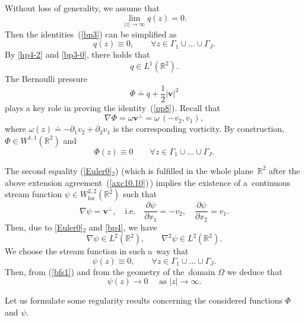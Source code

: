 \documentclass[11pt]{article}
\numberwithin{equation}{section}
\numberwithin{figure}{section}
\newcommand{\R}{\mathbb{R}}
\def\loc{{\mathrm{loc}}}
\def\R{{\mathbb R}}
\def\ve{{\mathbf v}}
\begin{document}
Without loss of generality, we assume that
 \begin{equation} \label{co-3}
 \lim\limits_{|z|\to\infty}q(z)=0.
\end{equation}
Then the identities~(\ref{bp3}) can be simplified as
\begin{equation} \label{bp3-0}
q(z)\equiv 0,\qquad\forall z\in\Gamma_1\cup\dots\cup\Gamma_J.\end{equation}
By \eqref{hp4-2} and \eqref{bp3-0}, there holds that
 \begin{equation} \label{co-5}
q\in L^1(\R^2).
\end{equation}
The Bernoulli pressure 
$$\Phi\doteq q+\frac12|\ve|^2$$ 
plays a key role in proving the identity~(\ref{pp8}). Recall that
\begin{equation}  \label{pp9}
\nabla\Phi=\omega\ve^\bot=\omega\,(-v_2,v_1),
\end{equation}
where $\omega(z)\doteq -\partial_1v_2+\partial_2v_1$ is the corresponding vorticity.
By construction, $\Phi\in W^{1,1}(\R^2)$ and
\begin{equation} \label{bf0}
\Phi(z)\equiv 0\qquad\forall z\in\Gamma_1\cup\dots\cup\Gamma_J.
\end{equation}

The second equality (\ref{Euler0}$_2$)  (which is fulfilled
in the whole plane~$\R^2$ after the
above extension agreement~(\ref{axc10.10})\,) implies the existence of a~continuous stream
function $\psi\in W^{2,2}_{\loc}(\R^2)$ such that
$$\nabla\psi=\ve^\bot,\quad\mbox{i.e.}\quad\frac{\partial\psi}{\partial x_1}=-v_2,\quad\frac{\partial\psi}{\partial x_2}=v_1.$$
Then, due to \eqref{Euler0}$_2$ and \eqref{bp4}, we have
 \begin{equation} \label{bfs1}
\nabla\psi\in L^2(\R^2),\qquad\nabla^2\psi\in L^2(\R^2).
\end{equation}
We choose the stream function in such a~way that
\begin{equation} \label{bfs0}
\psi(z)\equiv 0,\qquad\forall z\in\Gamma_1\cup\dots\cup\Gamma_J.\end{equation}
Then, from (\ref{bfs1}) and from the geometry of the~domain $\Omega$ we deduce that
\begin{equation} \label{bfs00}
\psi(z)\to0\quad\mbox{ as }|z|\to\infty.\end{equation}

Let us formulate some regularity results concerning the considered
functions $\Phi$ and $\psi$.
\end{document}
